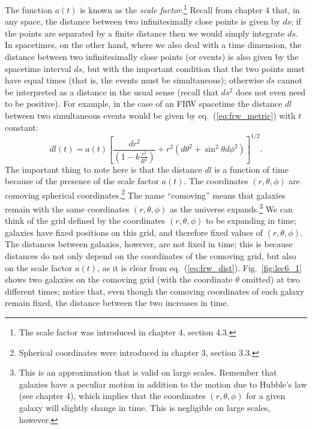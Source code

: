 The function $a(t)$ is known as the {\it scale factor}.\footnote{The scale factor was introduced in chapter 4, section 4.3.} Recall from chapter 4 that, in any space, the distance between two infinitesimally close points is given by $ds$; if the points are separated by a finite distance then we would simply integrate $ds$. In spacetimes, on the other hand, where we also deal with a time dimension, the distance between two infinitesimally close points (or events) is also given by the spacetime interval $ds$, but with the important condition that the two points must have equal times (that is, the events must be simultaneous); otherwise $ds$ cannot be interpreted as a distance in the usual sense (recall that $ds^2$ does not even need to be positive). For example, in the case of an FRW spacetime the distance $dl$ between two simultaneous events would be given by eq.\ (\ref{eq:frw_metric}) with $t$ constant:
\begin{equation} \label{eq:frw_dist}
dl(t)=a(t)\left[\frac{dr^2}{\left(1-k\frac{r^2}{R^2}\right)}+r^2\left(d\theta^2+\sin^2\theta d\phi^2\right)\right]^{1/2}.
\end{equation}
The important thing to note here is that the distance $dl$ is a function of time because of the presence of the scale factor $a(t)$. The coordinates $(r,\theta,\phi)$ are comoving spherical coordinates.\footnote{Spherical coordinates were introduced in chapter 3, section 3.3.} The name ``comoving'' means that galaxies remain with the same coordinates $(r,\theta,\phi)$ as the universe expands.\footnote{This is an approximation that is valid on large scales. Remember that galaxies have a peculiar motion in addition to the motion due to Hubble's law (see chapter 4), which implies that the coordinates $(r,\theta,\phi)$ for a given galaxy will slightly change in time. This is negligible on large scales, however.} We can think of the grid defined by the coordinates $(r,\theta,\phi)$ to be expanding in time; galaxies have fixed positions on this grid, and therefore fixed values of $(r,\theta,\phi)$. The distances between galaxies, however, are not fixed in time; this is because distances do not only depend on the 
coordinates of the comoving grid, but also on the scale factor $a(t)$, as it is clear from eq.\ (\ref{eq:frw_dist}). Fig.\ \ref{fig:lec6_1} shows two galaxies on the comoving grid (with the coordinate $\theta$ omitted) at two different times; notice that, even though the comoving coordinates of each galaxy remain fixed, the distance between the two increases in time.
